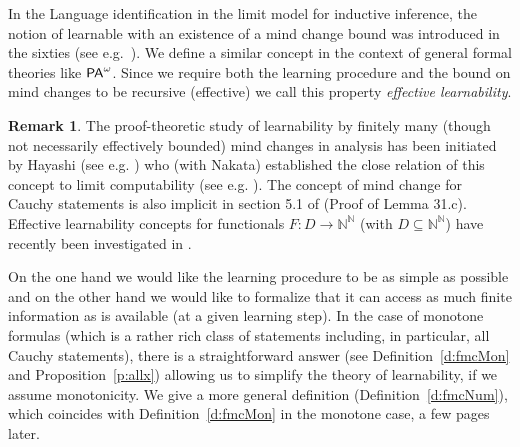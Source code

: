\documentclass[1p]{elsarticle}
\newcommand{\usftext}[1]{\textsf{\upshape #1}}
\newcommand{\NN}{\ensuremath{\mathbb{N}}}
\newcommand{\pa}{\ensuremath{{\usftext{PA}}^\omega}} %
\theoremstyle{plain}
\theoremstyle{definition}
\newtheorem{rmk}[thm]{Remark}
\theoremstyle{remark}
\theoremstyle{definition}
\begin{document}
In the Language identification in the limit model for inductive inference, the 
notion of learnable with an existence of a mind change bound was introduced in 
the sixties (see e.g.~\cite{Gold(67)}). We define a similar concept in the context of 
general formal theories like $\pa$. Since we require both the learning 
procedure and the bound on mind changes to be recursive (effective) we call 
this property {\em effective learnability}. 
\begin{rmk}
The proof-theoretic study of 
learnability by finitely 
many (though not necessarily effectively bounded) mind changes in analysis 
has been initiated by Hayashi (see e.g. \cite{Hayashi02,Hayashi06}) 
who (with Nakata) 
established the close relation of this 
concept to limit computability (see e.g. 
\cite{Hayashi/Nakata}). The concept of mind change for Cauchy statements is 
also implicit in section 5.1 of \cite{Ziegler(07)} (Proof of Lemma 31.c). 
Effective learnability concepts for 
functionals $F:D\to\NN^{\NN}$ (with $D\subseteq\NN^{\NN}$) have recently 
been investigated in \cite{Higuchi/Kihara}.
\end{rmk}
On the one hand we would like the learning procedure to be as simple as possible and on the other hand we would like to formalize that
it can access as much finite information as is available (at a given learning step). In the case of monotone formulas (which is a rather rich class of statements including, in 
particular, all Cauchy statements), there is a straightforward answer (see Definition~\ref{d:fmcMon} and Proposition~\ref{p:allx}) 
allowing us to simplify the theory of learnability, if we assume monotonicity.
We give a more general definition (Definition~\ref{d:fmcNum}), which coincides with Definition~\ref{d:fmcMon} in the monotone case, a few pages later.
\end{document}
